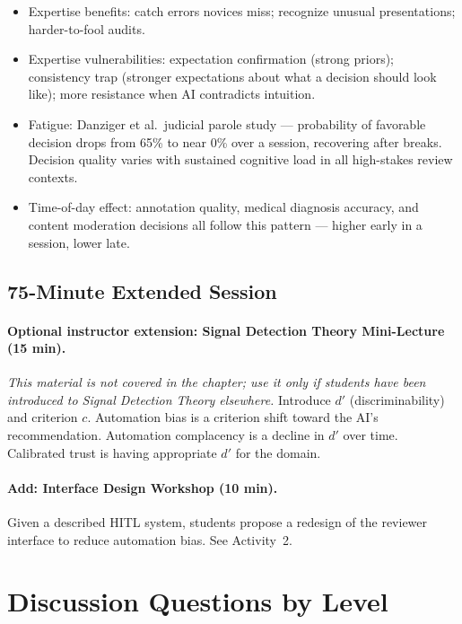 \begin{itemize}
    \item Expertise benefits: catch errors novices miss; recognize unusual presentations; harder-to-fool audits.
    \item Expertise vulnerabilities: expectation confirmation (strong priors); consistency trap (stronger expectations about what a decision should look like); more resistance when AI contradicts intuition.
    \item Fatigue: Danziger et al.\ judicial parole study --- probability of favorable decision drops from 65\% to near 0\% over a session, recovering after breaks. Decision quality varies with sustained cognitive load in all high-stakes review contexts.
    \item Time-of-day effect: annotation quality, medical diagnosis accuracy, and content moderation decisions all follow this pattern --- higher early in a session, lower late.
\end{itemize}

\subsection{75-Minute Extended Session}

\paragraph{Optional instructor extension: Signal Detection Theory Mini-Lecture (15 min).}
\emph{This material is not covered in the chapter; use it only if students have been introduced to Signal Detection Theory elsewhere.} Introduce $d'$ (discriminability) and criterion $c$. Automation bias is a criterion shift toward the AI's recommendation. Automation complacency is a decline in $d'$ over time. Calibrated trust is having appropriate $d'$ for the domain.

\paragraph{Add: Interface Design Workshop (10 min).}
Given a described HITL system, students propose a redesign of the reviewer interface to reduce automation bias. See Activity~2.

\section{Discussion Questions by Level}

